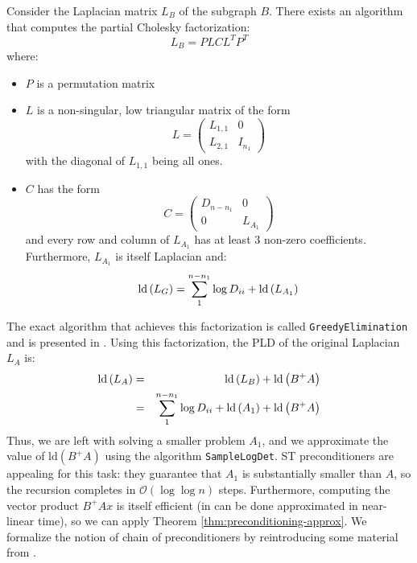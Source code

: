 Consider the Laplacian matrix $L_{B}$ of the subgraph $B$. There
exists an algorithm that computes the partial Cholesky factorization:
\[
L_{B}=PLCL^{T}P^{T}
\]
where: 
\begin{itemize}
\item $P$ is a permutation matrix 
\item $L$ is a non-singular, low triangular matrix of the form 
\[
L=\left(\begin{array}{cc}
L_{1,1} & 0\\
L_{2,1} & I_{n_{1}}
\end{array}\right)
\]
with the diagonal of $L_{1,1}$ being all ones. 
\item $C$ has the form 
\[
C=\left(\begin{array}{cc}
D_{n-n_{1}} & 0\\
0 & L_{A_{1}}
\end{array}\right)
\]
and every row and column of $L_{A_{1}}$ has at least 3 non-zero coefficients.
Furthermore, $L_{A_{1}}$ is itself Laplacian and: 
\[
\text{ld}\left(L_{G}\right)=\sum_{1}^{n-n_{1}}\log D_{ii}+\mbox{\text{ld}}\left(L_{A_{1}}\right)
\]

\end{itemize}
The exact algorithm that achieves this factorization is called \texttt{GreedyElimination}
and is presented in \cite{Koutis2010}. Using this factorization,
the PLD of the original Laplacian $L_{A}$ is: 
\begin{eqnarray}
\text{ld}\left(L_{A}\right) & = & \text{ld}\left(L_{B}\right)+\text{ld}\left(B^{+}A\right)\nonumber \\
 & = & \sum_{1}^{n-n_{1}}\log D_{ii}+\mbox{\text{ld}}\left(A_{1}\right)+\text{ld}\left(B^{+}A\right)\label{eq:chain-recursion}
\end{eqnarray}
Thus, we are left with solving a smaller problem $A_{1}$, and we
approximate the value of $\text{ld}\left(B^{+}A\right)$ using the
algorithm \texttt{SampleLogDet}. ST preconditioners are appealing
for this task: they guarantee that $A_{1}$ is substantially smaller
than $A$, so the recursion completes in $\mathcal{O}\left(\log\log n\right)$
steps. Furthermore, computing the vector product $B^{+}Ax$ is itself
efficient (in can be done approximated in near-linear time), so we
can apply Theorem \ref{thm:preconditioning-approx}. We formalize
the notion of chain of preconditioners by reintroducing some material
from \cite{Koutis2010}.


